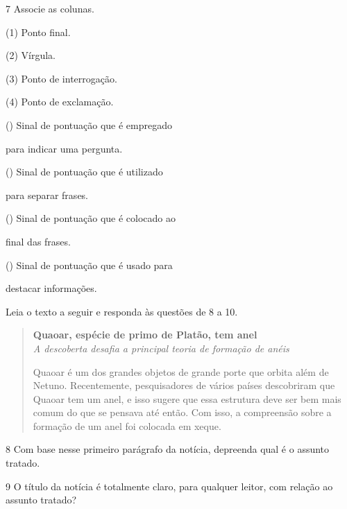 \num{7} Associe as colunas.

\begin{multicols}{2}
(1) Ponto final.\medskip

(2) Vírgula.\medskip

(3) Ponto de interrogação.\medskip

(4) Ponto de exclamação.

\columnbreak

({}) Sinal de pontuação que é empregado

para indicar uma pergunta.\medskip

({}) Sinal de pontuação que é utilizado

para separar frases.\medskip

({}) Sinal de pontuação que é colocado ao

final das frases.\medskip

({}) Sinal de pontuação que é usado para

destacar informações.
\end{multicols}


Leia o texto a seguir e responda às questões de 8 a 10.

\begin{quote}
\textbf{Quaoar, espécie de primo de Platão, tem anel}\\
\textit{A descoberta desafia a principal teoria de formação de anéis}

Quaoar é um dos grandes objetos de grande porte que orbita além de Netuno.
Recentemente, pesquisadores de vários países descobriram que Quaoar tem um
anel, e isso sugere que essa estrutura deve ser bem mais comum do que se
pensava até então. Com isso, a compreensão sobre a formação de um anel
foi colocada em xeque.

\end{quote}

\num{8} Com base nesse primeiro parágrafo da notícia, depreenda qual é o assunto tratado.



\num{9} O título da notícia é totalmente claro, para qualquer leitor, com relação ao assunto tratado?

